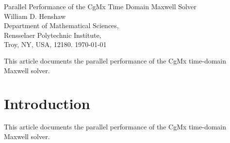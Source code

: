 \documentclass[11pt]{article}
\begin{document}



\newcommand{\Div}{\grad\cdot}
\newcommand{\tauv}{\boldsymbol{\tau}}
\newcommand{\sumi}{\sum_{i=1}^n}
\newcommand{\deltaT}{{\Delta t}}
\newcommand{\dt}{{\Delta t}}
\newcommand{\figWidth}{.475\linewidth}

\vspace{5\baselineskip}
\begin{flushleft}
{\LARGE Parallel Performance of the CgMx Time Domain Maxwell Solver} \\
\vspace{2\baselineskip}
William D. Henshaw  \\
Department of Mathematical Sciences, \\
Rensselaer Polytechnic Institute, \\
Troy, NY, USA, 12180.
\vspace{\baselineskip}
\today\\

\vspace{2\baselineskip}


This article documents the parallel performance of the CgMx time-domain Maxwell solver.

\end{flushleft}

\tableofcontents

\newcommand{\eps}{\epsilon}
\clearpage
\section{Introduction}

This article documents the parallel performance of the CgMx time-domain Maxwell solver.
\end{document}
